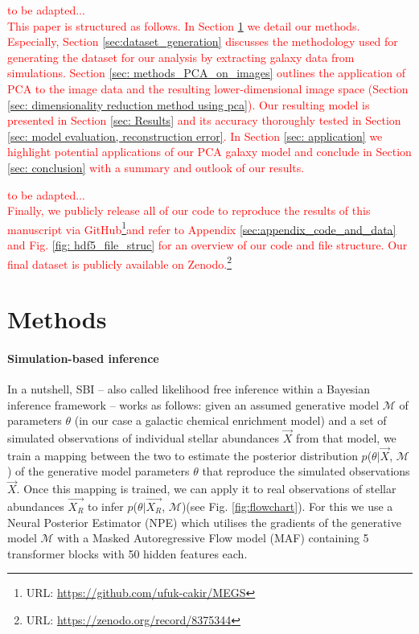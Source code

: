 \documentclass{aa}
\begin{document}
\textcolor{red}{to be adapted...\\
This paper is structured as follows. In Section \ref{sec:methods} we detail our methods. Especially, Section \ref{sec:dataset_generation} discusses the methodology used for generating the dataset for our analysis by extracting galaxy data from simulations. Section \ref{sec: methods_PCA_on_images} outlines the application of PCA to the image data and the resulting lower-dimensional image space (Section \ref{sec: dimensionality reduction method using pca}). Our resulting model is presented in Section \ref{sec: Results} and its accuracy thoroughly tested in Section \ref{sec: model evaluation, reconstruction error}. In Section \ref{sec: application} we highlight potential applications of our PCA galaxy model and conclude in Section \ref{sec: conclusion} with a summary and outlook of our results.}

\textcolor{red}{to be adapted...\\
Finally, we publicly release all of our code to reproduce the results of this manuscript via GitHub\footnote{URL: {\url{https://github.com/ufuk-cakir/MEGS}}}and refer to Appendix \ref{sec:appendix_code_and_data} and Fig. \ref{fig: hdf5_file_struc} for an overview of our code and file structure. Our final dataset is publicly available on Zenodo.\footnote{URL: \url{https://zenodo.org/record/8375344}}}

\section{Methods}
\label{sec:methods}

\paragraph{Simulation-based inference}
In a nutshell, SBI \citep[e.g.][]{Cranmer2020,Papamakarios:2021,Gloeckler2024AllinoneSI} -- also called likelihood free inference within a  Bayesian inference framework --  works as follows: given an assumed generative model $\mathcal{M}$ of parameters $\theta$ (in our case a galactic chemical enrichment model) and a set of simulated observations of individual stellar abundances $\Vec{X}$ from that model, we train a mapping between the two to estimate the posterior distribution $p$($\theta|\Vec{X}$, $\mathcal{M}$) of the generative model parameters $\theta$ that reproduce the simulated observations $\Vec{X}$. Once this mapping is trained, we can apply it to real observations of stellar abundances $\Vec{X_R}$ to infer $p$($\theta|\Vec{X_R}$, $\mathcal{M}$)(see Fig. \ref{fig:flowchart}).
For this we use a Neural Posterior Estimator (NPE) \cite{zeghal2022neuralposteriorestimationdifferentiable} which utilises the gradients of the generative model $\mathcal{M}$ with a Masked Autoregressive Flow model (MAF) \cite{papamakarios2018maskedautoregressiveflowdensity} containing 5 transformer blocks with 50 hidden features each.
\end{document}
